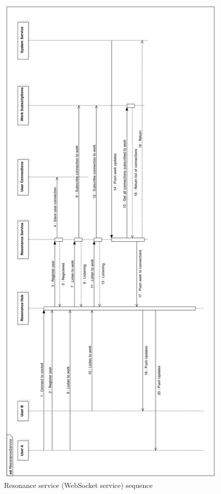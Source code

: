 \begin{figure}[H]
\caption{Resonance service (WebSocket service) sequence}
\centering
\includegraphics[width=\textwidth,height=\textheight,keepaspectratio]{images/operational/ResonanceService}
\end{figure}


